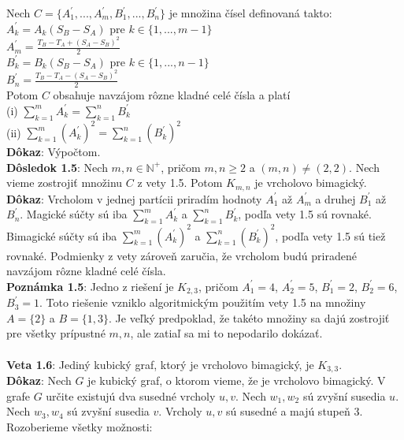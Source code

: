 \documentclass[12pt]{article}
\begin{document}
Nech $C = \{A^\prime_1, ... , A^\prime_m, B^\prime_1, ... , B^\prime_n\}$ je množina čísel definovaná takto: \\
$A^\prime_k = A_k (S_B - S_A)$ pre $k \in \{1, ... , m-1\}$ \\
$A^\prime_m = \frac{T_B - T_A + (S_A - S_B)^2}{2}$ \\
$B^\prime_k = B_k (S_B - S_A)$ pre $k \in \{1, ... , n-1\}$ \\
$B^\prime_n = \frac{T_B - T_A - (S_A - S_B)^2}{2}$ \\

Potom $C$ obsahuje navzájom rôzne kladné celé čísla a platí \\
(i) $\sum_{k=1}^{m} A^\prime_k = \sum_{k=1}^{n} B^\prime_k$ \\
(ii) $\sum_{k=1}^{m} (A^\prime_k)^2 = \sum_{k=1}^{n} (B^\prime_k)^2$ \\

\textbf{Dôkaz}: Výpočtom. \\

\textbf{Dôsledok 1.5}:  Nech $m,n \in \mathbb{N^+}$, pričom $m,n \geq 2$ a $(m, n) \neq (2, 2)$. Nech vieme zostrojiť množinu $C$ z vety 1.5. Potom $K _{m,n}$ je vrcholovo bimagický. \\

\textbf{Dôkaz}: Vrcholom v jednej partícii priradím hodnoty $A^\prime_1$ až $A^\prime_m$ a druhej $B^\prime_1$ až $B^\prime_n$. Magické súčty sú iba $\sum_{k=1}^{m} A^\prime_k$ a $\sum_{k=1}^{n} B^\prime_k$, podľa vety 1.5 sú rovnaké. Bimagické súčty sú iba $\sum_{k=1}^{m} (A^\prime_k)^2$ a $\sum_{k=1}^{n} (B^\prime_k)^2$, podľa vety 1.5 sú tiež rovnaké. Podmienky z vety zároveň zaručia, že vrcholom budú priradené navzájom rôzne kladné celé čísla. \\

\textbf{Poznámka 1.5}: Jedno z riešení je $K _{2,3}$, pričom $A^\prime_1 = 4$, $A^\prime_2 = 5$, $B^\prime_1 = 2$, $B^\prime_2 = 6$, $B^\prime_3 = 1$. Toto riešenie vzniklo algoritmickým použitím vety 1.5 na množiny $A = \{2\}$ a $B = \{1,3\}$. Je veľký predpoklad, že takéto množiny sa dajú zostrojiť pre všetky prípustné $m,n$, ale zatiaľ sa mi to nepodarilo dokázať. \\\\

\textbf{Veta 1.6}: Jediný kubický graf, ktorý je vrcholovo bimagický, je $K_{3,3}$. \\

\textbf{Dôkaz}: Nech $G$ je kubický graf, o ktorom vieme, že je vrcholovo bimagický. V grafe $G$ určite existujú dva susedné vrcholy $u,v$. Nech $w_1, w_2$ sú zvyšní susedia $u$. Nech $w_3, w_4$ sú zvyšní susedia $v$. Vrcholy $u,v$ sú susedné a majú stupeň 3. Rozoberieme všetky možnosti: \\
\end{document}
